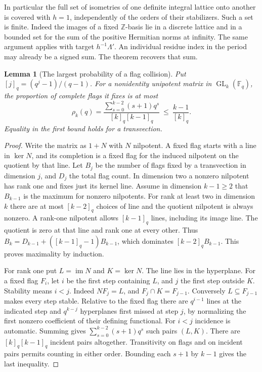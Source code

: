 \documentclass[a4paper,11pt]{article}
\newtheorem{lemma}[proposition]{Lemma}
\theoremstyle{definition}
\theoremstyle{remark}
\numberwithin{equation}{section}
\begin{document}
In particular the full set of isometries of one definite integral
lattice onto another is covered with \(h=1\), independently of the
orders of their stabilizers. Such a set is finite. Indeed the images
of a fixed \(\mathbb Z\)-basis lie in a discrete lattice and in a
bounded set for the sum of the positive Hermitian norms at infinity.
The same argument applies with target \(h^{-1}\Lambda'\).
An individual residue index in the period may already be a signed
sum. The theorem recovers that sum.

\begin{lemma}[The largest probability of a flag collision]
\leavevmode\label{lem:flagcollision530}
Put \([j]_q=(q^j-1)/(q-1)\). For a nonidentity unipotent matrix
in \(\operatorname{GL}_k(\mathbb F_q)\), the proportion of
complete flags it fixes is at most
\[
        \rho_k(q)=
        \frac{\sum_{s=0}^{k-2}(s+1)q^s}{[k]_q[k-1]_q}
        \ \le\ \frac{k-1}{[k]_q}.
\]
Equality in the first bound holds for a transvection.
\end{lemma}
\begin{proof}
Write the matrix as \(1+N\) with \(N\) nilpotent. A fixed flag
starts with a line in \(\ker N\), and its completion is a fixed
flag for the induced nilpotent on the quotient by that line.
Let \(B_j\) be the number of flags fixed by a transvection in
dimension \(j\), and \(D_j\) the total flag count. In dimension
two a nonzero nilpotent has rank one and fixes just its kernel
line. Assume in dimension \(k-1\ge2\) that \(B_{k-1}\) is the
maximum for nonzero nilpotents. For rank at least two in
dimension \(k\) there are at most \([k-2]_q\) choices of line
and the quotient nilpotent is always nonzero. A rank-one
nilpotent allows \([k-1]_q\) lines, including its image line.
The quotient is zero at that line and rank one at every other.
Thus \(B_k=D_{k-1}+([k-1]_q-1)B_{k-1}\), which dominates
\([k-2]_q B_{k-1}\). This proves maximality by induction.

For rank one put \(L=\operatorname{im}N\) and \(K=\ker N\).
The line lies in the hyperplane. For a fixed flag \(F_i\), let
\(i\) be the first step containing \(L\), and \(j\) the first
step outside \(K\). Stability means \(i<j\). Indeed
\(N F_j=L\), and \(F_j\cap K=F_{j-1}\). Conversely \(L\subseteq
F_{j-1}\) makes every step stable. Relative to the fixed flag
there are \(q^{i-1}\) lines at the indicated step and
\(q^{k-j}\) hyperplanes first missed at step \(j\), by
normalizing the first nonzero coefficient of their defining
functional. For \(i<j\) incidence is automatic. Summing gives
\(\sum_{s=0}^{k-2}(s+1)q^s\) such pairs \((L,K)\).
There are \([k]_q[k-1]_q\) incident pairs altogether.
Transitivity on flags and on incident pairs permits counting in
either order. Bounding each \(s+1\) by \(k-1\) gives the last
inequality.
\end{proof}
\end{document}
